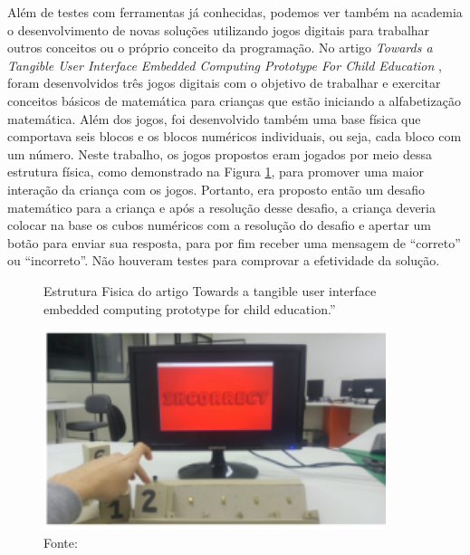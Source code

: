 Além de testes com ferramentas já conhecidas, podemos ver também na academia o desenvolvimento de novas soluções utilizando jogos digitais para trabalhar outros conceitos ou o próprio conceito da programação. No artigo \textit{Towards a Tangible User Interface Embedded Computing Prototype For Child Education} \cite{carneiro_2018}, foram desenvolvidos três jogos digitais com o objetivo de trabalhar e exercitar conceitos básicos de matemática para crianças que estão iniciando a alfabetização matemática. Além dos jogos, foi desenvolvido também uma base física que comportava seis blocos e os blocos numéricos individuais, ou seja, cada bloco com um número. Neste trabalho, os jogos propostos eram jogados por meio dessa estrutura física, como demonstrado na Figura \ref{figura:estrutura_artigo_towards}, para promover uma maior interação da criança com os jogos. Portanto, era proposto então um desafio matemático para a criança e após a resolução desse desafio, a criança deveria colocar na base os cubos numéricos com a resolução do desafio e apertar um botão para enviar sua resposta, para por fim receber uma mensagem de “correto” ou “incorreto”. Não houveram testes para comprovar a efetividade da solução. 

\begin{figure}[h!]
    \centering
    \caption{Estrutura Fisica do artigo Towards a tangible user interface embedded computing prototype for child education.”}
    \includegraphics[width=10cm]{images/cap2/estrutura_artigo_towards.png}
    \caption*{Fonte: \cite{carneiro_2018}}
    \label{figura:estrutura_artigo_towards}
\end{figure}

